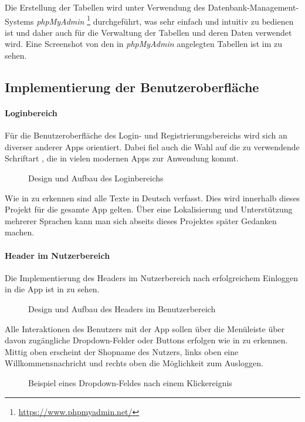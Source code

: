 Die Erstellung der Tabellen wird unter Verwendung des Datenbank-Management-Systems \textit{phpMyAdmin} \footnote{\url{https://www.phpmyadmin.net/}} durchgeführt, was sehr einfach und intuitiv zu bedienen ist und daher auch für die Verwaltung der Tabellen und deren Daten verwendet wird. Eine Screenshot von den in \textit{phpMyAdmin} angelegten Tabellen ist im  zu sehen.

\subsection{Implementierung der Benutzeroberfläche}
\label{sec:ImplementierungBenutzeroberflaeche}

\paragraph{Loginbereich} Für die Benutzeroberfläche des Login- und Registrierungsbereichs wird sich an diverser anderer Apps orientiert. Dabei fiel auch die Wahl auf die zu verwendende Schriftart , die in vielen modernen Apps zur Anwendung kommt.
\begin{figure}[htb]
\centering
{}
\caption{Design und Aufbau des Loginbereichs}
\label{fig:loginbereich}
\end{figure} 
Wie in  zu erkennen sind alle Texte in Deutsch verfasst. Dies wird innerhalb dieses Projekt für die gesamte App gelten. Über eine Lokalisierung und Unterstützung mehrerer Sprachen kann man sich abseits dieses Projektes später Gedanken machen.
\newpage
\paragraph{Header im Nutzerbereich}
Die Implementierung des Headers im Nutzerbereich nach erfolgreichem Einloggen in die App ist in  zu sehen.
\begin{figure}[htb]
\centering
{}
\caption{Design und Aufbau des Headers im Benutzerbereich}
\label{fig:nutzerbereich}
\end{figure}
Alle Interaktionen des Benutzers mit der App sollen über die Menüleiste über davon zugängliche Dropdown-Felder oder Buttons erfolgen wie in  zu erkennen. Mittig oben erscheint der Shopname des Nutzers, links oben eine Willkommensnachricht und rechts oben die Möglichkeit zum Ausloggen.
 \begin{figure}[htb]
\centering
{}
\caption{Beispiel eines Dropdown-Feldes nach einem Klickereignis}
\label{fig:dropdown}
\end{figure}
